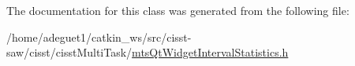 The documentation for this class was generated from the following file\-:\begin{DoxyCompactItemize}
\item 
/home/adeguet1/catkin\-\_\-ws/src/cisst-\/saw/cisst/cisst\-Multi\-Task/\hyperlink{mts_qt_widget_interval_statistics_8h}{mts\-Qt\-Widget\-Interval\-Statistics.\-h}\end{DoxyCompactItemize}
